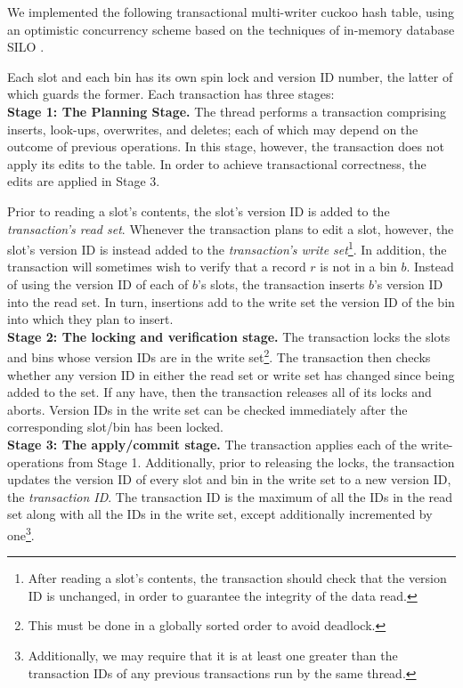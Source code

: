 \documentclass{sig-alternate-05-2015}
\begin{document}
We implemented the following transactional multi-writer cuckoo hash
table, using an optimistic concurrency scheme based on the techniques
of in-memory database SILO \cite{silo13}.

Each slot and each bin has its own spin lock and version ID number,
the latter of which guards the former. Each transaction has three
stages: \\ \textbf{Stage 1: The Planning Stage. }The thread performs a
transaction comprising inserts, look-ups, overwrites, and deletes;
each of which may depend on the outcome of previous operations. In
this stage, however, the transaction does not apply its edits to the
table. In order to achieve transactional correctness, the edits are
applied in Stage 3.

Prior to reading a slot's contents, the slot's version ID is added to
the \emph{transaction's read set}. Whenever the transaction plans to
edit a slot, however, the slot's version ID is instead added to the
\emph{transaction's write set}\footnote{After reading a slot's contents, the
transaction should check that the version ID is unchanged, in order to
guarantee the integrity of the data read.}. In addition, the transaction
will sometimes wish to verify that a record $r$ is not in a bin
$b$. Instead of using the version ID of each of $b$'s slots, the
transaction inserts $b$'s version ID into the read set. In turn,
insertions add to the write set the version ID of the bin into which
they plan to insert. \\ \textbf{Stage 2: The locking and verification
  stage. } The transaction locks the slots and bins whose version IDs
are in the write set\footnote{This must be done in a globally sorted
  order to avoid deadlock.}. The transaction then checks whether any
version ID in either the read set or write set has changed since being
added to the set. If any have, then the transaction releases all of
its locks and aborts. Version IDs in the write set can be checked
immediately after the corresponding slot/bin has been
locked. \\ \textbf{Stage 3: The apply/commit stage. } The transaction
applies each of the write-operations from Stage 1. Additionally, prior
to releasing the locks, the transaction updates the version ID of
every slot and bin in the write set to a new version ID, the
\emph{transaction ID}. The transaction ID is the maximum of all the
IDs in the read set along with all the IDs in the write set, except
additionally incremented by one\footnote{Additionally, we may require
  that it is at least one greater than the transaction IDs of any
  previous transactions run by the same thread.}.
\end{document}
